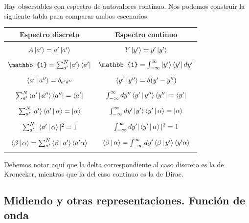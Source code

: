 \documentclass[10pt,oneside]{CBFT_book}
\begin{document}
Hay observables con espectro de autovalores continuo.
Nos podemos construir la siguiente tabla para comparar ambos escenarios.

\begin{tabular}{|c|c|}
\hline 
Espectro discreto & Espectro continuo \\
\hline
  & \\
  $A\Ket{a'}=a'\ket{a'}$ & $Y\Ket{y'}=y'\ket{y'}$ \\
  & \\
  $\mathbb{1} = \sum_{a' }^N \Ket{a'}\Bra{a'} $ & $\mathbb{1} = 
  \int_{-\infty}^ {\infty} \Ket{y'}\Bra{y'} dy' $ \\
  & \\
  $\Braket{a'|a''} = \delta_{a' a''}$ & $\Braket{y'|y''} = \delta(y'-y'')$ \\
  & \\
  $ \sum_{a' }^N \Braket{a'|a''}\Bra{a''} = \Bra{a'}$ & 
  $ \int_{-\infty}^\infty dy'' \Braket{y'|y''}\Bra{y''} = \Bra{y'}$ \\
  & \\
  $ \sum_{a' }^N \Ket{a'} \Braket{a'|\alpha} = 
  \Ket{\alpha}$ & $ \int_{-\infty}^\infty dy' \Ket{y'}\Braket{y'|\alpha} = \Ket{\alpha}$ \\
  & \\
  $ \sum_{a' }^N |\Braket{a'|\alpha}|^2 = 1$ & 
  $ \int_{-\infty}^\infty dy'|\Braket{y'|\alpha}|^2 = 1$ \\  & \\
  $ \Braket{\beta | \alpha}  = \sum_{a' }^N \Braket{\beta|a'}\Braket{a'\alpha}$ & 
  $ \Braket{\beta | \alpha}  = \int_{-\infty}^\infty dy' \Braket{\beta|y'}\Braket{y'\alpha}$ \\
  & \\
\hline  
\end{tabular} 

Debemos notar aquí que la delta correspondiente al caso discreto es la de Kronecker,
mientras que la del caso continuo es la de Dirac.

\subsection{Midiendo y otras representaciones. Función de onda}
\end{document}
